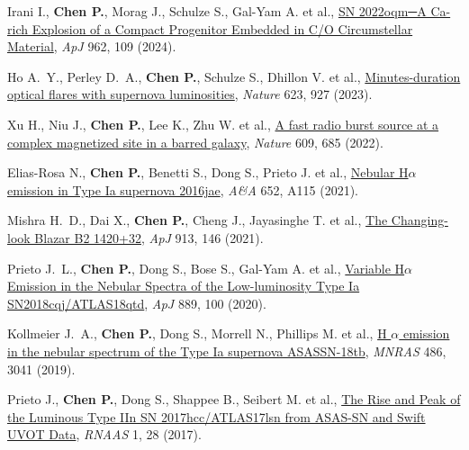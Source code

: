 \item Irani I., \textbf{Chen P.}, Morag J., Schulze S., Gal-Yam A. et al., \href{https://ui.adsabs.harvard.edu/abs/2024ApJ...962..109I}{SN 2022oqm─A Ca-rich Explosion of a Compact Progenitor Embedded in C/O Circumstellar Material}, \textit{ApJ} 962, 109 (2024).

\item Ho A.~Y., Perley D.~A., \textbf{Chen P.}, Schulze S., Dhillon V. et al., \href{https://ui.adsabs.harvard.edu/abs/2023Natur.623..927H}{Minutes-duration optical flares with supernova luminosities}, \textit{Nature} 623, 927 (2023).

\item Xu H., Niu J., \textbf{Chen P.}, Lee K., Zhu W. et al., \href{https://ui.adsabs.harvard.edu/abs/2022Natur.609..685X}{A fast radio burst source at a complex magnetized site in a barred galaxy}, \textit{Nature} 609, 685 (2022).

\item Elias-Rosa N., \textbf{Chen P.}, Benetti S., Dong S., Prieto J. et al., \href{https://ui.adsabs.harvard.edu/abs/2021A&A...652A.115E}{Nebular H{\ensuremath{\alpha}} emission in Type Ia supernova 2016jae}, \textit{A\&A} 652, A115 (2021).

\item Mishra H.~D., Dai X., \textbf{Chen P.}, Cheng J., Jayasinghe T. et al., \href{https://ui.adsabs.harvard.edu/abs/2021ApJ...913..146M}{The Changing-look Blazar B2 1420+32}, \textit{ApJ} 913, 146 (2021).

\item Prieto J.~L., \textbf{Chen P.}, Dong S., Bose S., Gal-Yam A. et al., \href{https://ui.adsabs.harvard.edu/abs/2020ApJ...889..100P}{Variable H{\ensuremath{\alpha}} Emission in the Nebular Spectra of the Low-luminosity Type Ia SN2018cqj/ATLAS18qtd}, \textit{ApJ} 889, 100 (2020).

\item Kollmeier J.~A., \textbf{Chen P.}, Dong S., Morrell N., Phillips M. et al., \href{https://ui.adsabs.harvard.edu/abs/2019MNRAS.486.3041K}{H {\ensuremath{\alpha}} emission in the nebular spectrum of the Type Ia supernova ASASSN-18tb}, \textit{MNRAS} 486, 3041 (2019).

\item Prieto J., \textbf{Chen P.}, Dong S., Shappee B., Seibert M. et al., \href{https://ui.adsabs.harvard.edu/abs/2017RNAAS...1...28P}{The Rise and Peak of the Luminous Type IIn SN 2017hcc/ATLAS17lsn from ASAS-SN and Swift UVOT Data}, \textit{RNAAS} 1, 28 (2017).

